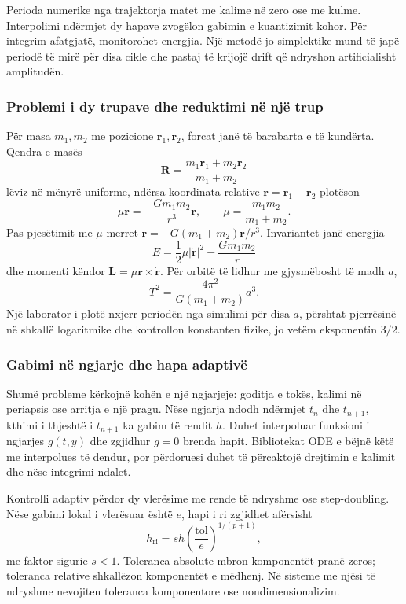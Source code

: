 \documentclass[11pt,oneside,openany]{book}
\newcommand{\vect}[1]{\bm{#1}}
\begin{document}
Perioda numerike nga trajektorja matet me kalime në zero ose me kulme. Interpolimi ndërmjet dy hapave zvogëlon gabimin e kuantizimit kohor. Për integrim afatgjatë, monitorohet energjia. Një metodë jo simplektike mund të japë periodë të mirë për disa cikle dhe pastaj të krijojë drift që ndryshon artificialisht amplitudën.

\subsubsection{Problemi i dy trupave dhe reduktimi në një trup}
Për masa $m_1,m_2$ me pozicione $\vect r_1,\vect r_2$, forcat janë të barabarta e të kundërta. Qendra e masës
\begin{equation}
 \vect R=\frac{m_1\vect r_1+m_2\vect r_2}{m_1+m_2}
\end{equation}
lëviz në mënyrë uniforme, ndërsa koordinata relative $\vect r=\vect r_1-\vect r_2$ plotëson
\begin{equation}
 \mu\ddot{\vect r}=-\frac{Gm_1m_2}{r^3}\vect r,
 \qquad \mu=\frac{m_1m_2}{m_1+m_2}.
\end{equation}
Pas pjesëtimit me $\mu$ merret $\ddot{\vect r}=-G(m_1+m_2)\vect r/r^3$. Invariantet janë energjia
\begin{equation}
 E=\frac12\mu|\dot{\vect r}|^2-\frac{Gm_1m_2}{r}
\end{equation}
dhe momenti këndor $\vect L=\mu\vect r\times\dot{\vect r}$. Për orbitë të lidhur me gjysmëbosht të madh $a$,
\begin{equation}
 T^2=\frac{4\pi^2}{G(m_1+m_2)}a^3.
\end{equation}
Një laborator i plotë nxjerr periodën nga simulimi për disa $a$, përshtat pjerrësinë në shkallë logaritmike dhe kontrollon konstanten fizike, jo vetëm eksponentin $3/2$.

\subsubsection{Gabimi në ngjarje dhe hapa adaptivë}
Shumë probleme kërkojnë kohën e një ngjarjeje: goditja e tokës, kalimi në periapsis ose arritja e një pragu. Nëse ngjarja ndodh ndërmjet $t_n$ dhe $t_{n+1}$, kthimi i thjeshtë i $t_{n+1}$ ka gabim të rendit $h$. Duhet interpoluar funksioni i ngjarjes $g(t,y)$ dhe zgjidhur $g=0$ brenda hapit. Bibliotekat ODE e bëjnë këtë me interpolues të dendur, por përdoruesi duhet të përcaktojë drejtimin e kalimit dhe nëse integrimi ndalet.

Kontrolli adaptiv përdor dy vlerësime me rende të ndryshme ose step-doubling. Nëse gabimi lokal i vlerësuar është $e$, hapi i ri zgjidhet afërsisht
\begin{equation}
 h_{\mathrm{ri}}=s h\left(\frac{\mathrm{tol}}{e}\right)^{1/(p+1)},
\end{equation}
me faktor sigurie $s<1$. Toleranca absolute mbron komponentët pranë zeros; toleranca relative shkallëzon komponentët e mëdhenj. Në sisteme me njësi të ndryshme nevojiten toleranca komponentore ose nondimensionalizim.
\end{document}
